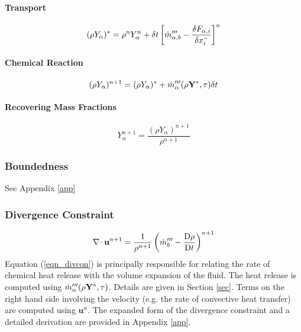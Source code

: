 \documentclass[11pt]{article}
\begin{document}
\paragraph{Transport}

\begin{equation}
\label{eqn_densityupdate}
(\rho Y_\alpha)^* = \rho^n Y_\alpha^n + \delta t \left[\dot{m}_{\alpha,b}^{\prime\prime\prime} - \frac{\delta F_{\alpha,i}}{\delta x_i^{\scriptscriptstyle -}} \right]^n
\end{equation}

\paragraph{Chemical Reaction}

\begin{equation}
(\rho Y_\alpha)^{n+1} = (\rho Y_\alpha)^* + \dot{m}_{\alpha}^{\prime\prime\prime}(\rho \mathbf{Y}^*,\tau)\delta t 
\end{equation}

\paragraph{Recovering Mass Fractions}

\begin{equation}
Y_\alpha^{n+1} = \frac{(\rho Y_\alpha)^{n+1}}{\rho^{n+1}}
\end{equation}

\subsubsection{Boundedness} See Appendix \ref{app}

\subsubsection{Divergence Constraint}

\begin{equation}
\label{eqn_divcon}
{\nabla\!\cdot\mathbf{u}}^{n+1} = \frac{1}{\rho^{n+1}}\left(\dot{m}_b^{\prime\prime\prime} - \frac{\mbox{D}\rho}{\mbox{D}t}\right)^{n+1}
\end{equation}
Equation (\ref{eqn_divcon}) is principally responsible for relating the rate of chemical heat release with the volume expansion of the fluid. The heat release is computed using $\dot{m}_{\alpha}^{\prime\prime\prime}(\rho \mathbf{Y}^*,\tau)$. Details are given in Section \ref{sec}. Terms on the right hand side involving the velocity (e.g. the rate of convective heat transfer) are computed using $\mathbf{u}^n$. The expanded form of the divergence constraint and a detailed derivation are provided in Appendix \ref{app}.
\end{document}
